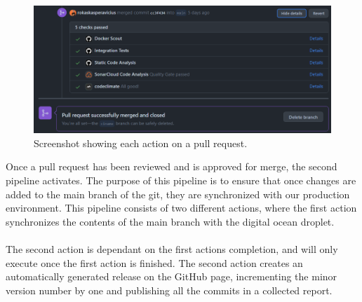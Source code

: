 \begin{figure}[H]
    \centering
    \includegraphics[width=0.8\linewidth]{img/pullRequestReportings.png}
    \caption{Screenshot showing each action on a pull request.}
    \label{fig:PR reportings}
\end{figure}

Once a pull request has been reviewed and is approved for merge, the second pipeline activates. The purpose of this pipeline is to ensure that once changes are added to the main branch of the git, they are synchronized with our production environment. This pipeline consists of two different actions, where the first action synchronizes the contents of the main branch with the digital ocean droplet. 
\\
\\
The second action is dependant on the first actions completion, and will only execute once the first action is finished. The second action creates an automatically generated release on the GitHub page, incrementing the minor version number by one and publishing all the commits in a collected report. 
